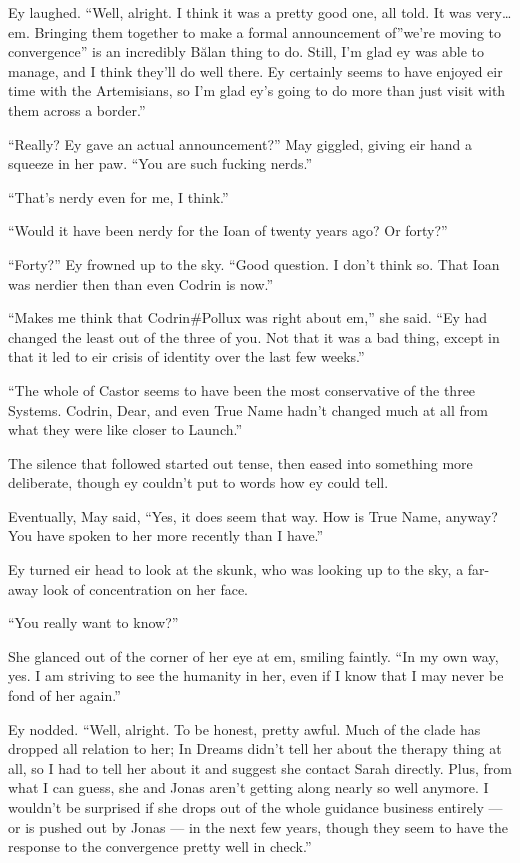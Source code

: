 Ey laughed. ``Well, alright. I think it was a pretty good one, all told. It was very\ldots em. Bringing them together to make a formal announcement of''we're moving to convergence'' is an incredibly Bălan thing to do. Still, I'm glad ey was able to manage, and I think they'll do well there. Ey certainly seems to have enjoyed eir time with the Artemisians, so I'm glad ey's going to do more than just visit with them across a border.''

``Really? Ey gave an actual announcement?'' May giggled, giving eir hand a squeeze in her paw. ``You are such fucking nerds.''

``That's nerdy even for me, I think.''

``Would it have been nerdy for the Ioan of twenty years ago? Or forty?''

``Forty?'' Ey frowned up to the sky. ``Good question. I don't think so. That Ioan was nerdier then than even Codrin is now.''

``Makes me think that Codrin\#Pollux was right about em,'' she said. ``Ey had changed the least out of the three of you. Not that it was a bad thing, except in that it led to eir crisis of identity over the last few weeks.''

``The whole of Castor seems to have been the most conservative of the three Systems. Codrin, Dear, and even True Name hadn't changed much at all from what they were like closer to Launch.''

The silence that followed started out tense, then eased into something more deliberate, though ey couldn't put to words how ey could tell.

Eventually, May said, ``Yes, it does seem that way. How is True Name, anyway? You have spoken to her more recently than I have.''

Ey turned eir head to look at the skunk, who was looking up to the sky, a far-away look of concentration on her face.

``You really want to know?''

She glanced out of the corner of her eye at em, smiling faintly. ``In my own way, yes. I am striving to see the humanity in her, even if I know that I may never be fond of her again.''

Ey nodded. ``Well, alright. To be honest, pretty awful. Much of the clade has dropped all relation to her; In Dreams didn't tell her about the therapy thing at all, so I had to tell her about it and suggest she contact Sarah directly. Plus, from what I can guess, she and Jonas aren't getting along nearly so well anymore. I wouldn't be surprised if she drops out of the whole guidance business entirely — or is pushed out by Jonas — in the next few years, though they seem to have the response to the convergence pretty well in check.''

